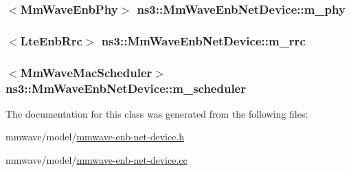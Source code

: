 \subsubsection[{\texorpdfstring{m\+\_\+phy}{m_phy}}]{$<${\bf Mm\+Wave\+Enb\+Phy}$>$ ns3\+::\+Mm\+Wave\+Enb\+Net\+Device\+::m\+\_\+phy\hspace{0.3cm}{\ttfamily [private]}}\hypertarget{classns3_1_1MmWaveEnbNetDevice_a42098011e0d238752d0ad74d1bcb17f6}{}\label{classns3_1_1MmWaveEnbNetDevice_a42098011e0d238752d0ad74d1bcb17f6}
\subsubsection[{\texorpdfstring{m\+\_\+rrc}{m_rrc}}]{$<${\bf Lte\+Enb\+Rrc}$>$ ns3\+::\+Mm\+Wave\+Enb\+Net\+Device\+::m\+\_\+rrc\hspace{0.3cm}{\ttfamily [private]}}\hypertarget{classns3_1_1MmWaveEnbNetDevice_ab2f138e7fc0b009e2e2876e271d9a3a4}{}\label{classns3_1_1MmWaveEnbNetDevice_ab2f138e7fc0b009e2e2876e271d9a3a4}
\subsubsection[{\texorpdfstring{m\+\_\+scheduler}{m_scheduler}}]{$<${\bf Mm\+Wave\+Mac\+Scheduler}$>$ ns3\+::\+Mm\+Wave\+Enb\+Net\+Device\+::m\+\_\+scheduler\hspace{0.3cm}{\ttfamily [private]}}\hypertarget{classns3_1_1MmWaveEnbNetDevice_a7308e79d47671caa554ac88aaf6603de}{}\label{classns3_1_1MmWaveEnbNetDevice_a7308e79d47671caa554ac88aaf6603de}


The documentation for this class was generated from the following files\+:\begin{DoxyCompactItemize}
\item 
mmwave/model/\hyperlink{mmwave-enb-net-device_8h}{mmwave-\/enb-\/net-\/device.\+h}\item 
mmwave/model/\hyperlink{mmwave-enb-net-device_8cc}{mmwave-\/enb-\/net-\/device.\+cc}\end{DoxyCompactItemize}
